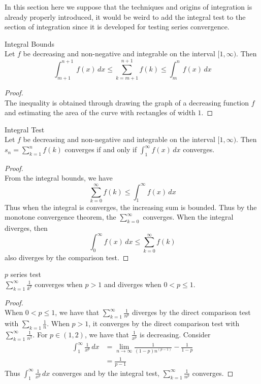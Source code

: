 \documentclass[a4paper]{article}
\begin{document}
In this section here we suppose that the techniques and origins of integration is already properly introduced, it would be weird to add the integral test to the section of integration since it is developed for testing series convergence. 
\begin{thm}{Integral Bounds}{}\\ Let $f$ be decreasing and non-negative and integrable on the interval $[1,\infty)$. Then $$\int_{m+1}^{n+1}f(x)\,dx\leq\sum_{k=m+1}^{n+1}f(k)\leq\int_{m}^{n}f(x)\,dx$$ 
\begin{proof}\\ The inequality is obtained through drawing the graph of a decreasing function $f$ and estimating the area of the curve with rectangles of width $1$. 
\end{proof}
\end{thm}

\begin{thm}{Integral Test}{}\\ Let $f$ be decreasing and non-negative and integrable on the interval $[1,\infty)$. Then $s_n=\sum_{k=1}^{n}f(k)$ converges if and only if $\int_{1}^{\infty}f(x)\,dx$ converges. 
\begin{proof}\\ From the integral bounds, we have $$\sum_{k=0}^{\infty}f(k)\leq\int_{1}^{\infty}f(x)\,dx$$ Thus when the integral is converges, the increasing sum is bounded. Thus by the monotone convergence theorem, the $\sum_{k=0}^{\infty}$ converges. When the integral diverges, then $$\int_{0}^{\infty}f(x)\,dx\leq\sum_{k=0}^{\infty}f(k)$$ also diverges by the comparison test. 
\end{proof}
\end{thm}

\begin{thm}{$p$ series test}{}\\ $\sum_{k=1}^{\infty}\frac{1}{k^p}$ converges when $p>1$ and diverges when $0<p\leq1$. 
\begin{proof}\\ When $0<p\leq1$, we have that $\sum_{k=1}^{\infty}\frac{1}{n^p}$ diverges by the direct comparison test with $\sum_{k=1}\frac{1}{n}$. When $p>1$, it converges by the direct comparison test with $\sum_{k=1}^{\infty}\frac{1}{n^2}$. For $p\in(1,2)$, we have that $\frac{1}{x^p}$ is decreasing. Consider 
\begin{align*}
\int_{1}^{\infty}\frac{1}{x^p}\,dx&=\lim_{n\to\infty}\frac{1}{(1-p)n^{(p-1)}}-\frac{1}{1-p}\\
&=\frac{1}{p-1}
\end{align*}Thus $\int_{1}^{\infty}\frac{1}{x^p}\,dx$ converges and by the integral test, $\sum_{k=1}^{\infty}\frac{1}{n^p}$ converges. 
\end{proof}
\end{thm}
\end{document}
